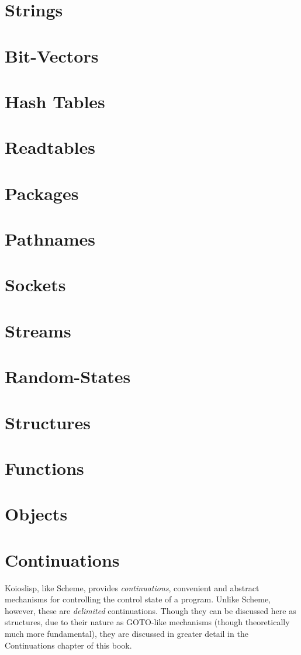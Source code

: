 \documentclass[10pt]{book}
\begin{document}
\section{Strings}
\section{Bit-Vectors}
\section{Hash Tables}
\section{Readtables}
\section{Packages}
\section{Pathnames}
\section{Sockets}
\section{Streams}
\section{Random-States}
\section{Structures}
\section{Functions}
\section{Objects}
\section{Continuations}
{\sc Koioslisp}, like Scheme, provides \textit{continuations}, convenient and abstract mechanisms for controlling the control state of a program. Unlike Scheme, however, these are \textit{delimited} continuations. Though they can be discussed here as structures, due to their nature as GOTO-like mechanisms (though theoretically much more fundamental), they are discussed in greater detail in the Continuations chapter of this book.
\end{document}
